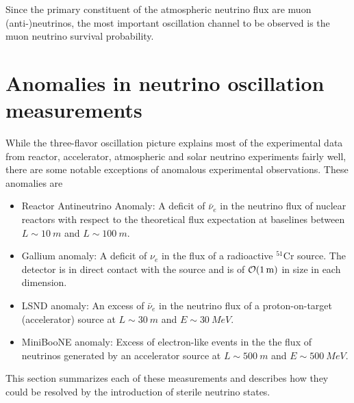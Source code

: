 Since the primary constituent of the atmospheric neutrino flux are muon (anti-)neutrinos, the most important oscillation channel to be observed is the muon neutrino survival probability.

\section{Anomalies in neutrino oscillation measurements}
While the three-flavor oscillation picture explains most of the experimental data from reactor, accelerator, atmospheric and solar neutrino experiments fairly well, there are some notable exceptions of anomalous experimental observations. These anomalies are
\begin{itemize}
    \item Reactor Antineutrino Anomaly: A deficit of $\bar{\nu}_e$ in the neutrino flux of nuclear reactors with respect to the theoretical flux expectation at baselines between $L\sim\SI{10}{m}$ and $L\sim\SI{100}{m}$.
    \item Gallium anomaly: A deficit of $\nu_e$ in the flux of a radioactive $^{51}\mathrm{Cr}$ source. The detector is in direct contact with the source and is of $\order{\SI{1}{m}}$ in size in each dimension.
    \item LSND anomaly: An excess of $\bar{\nu}_e$ in the neutrino flux of a proton-on-target (accelerator) source at $L\sim\SI{30}{m}$ and $E\sim\SI{30}{MeV}$.
    \item MiniBooNE anomaly: Excess of electron-like events in the the flux of neutrinos generated by an accelerator source at $L\sim\SI{500}{m}$ and $E\sim\SI{500}{MeV}$.
\end{itemize}
This section summarizes each of these measurements and describes how they could be resolved by the introduction of sterile neutrino states.

